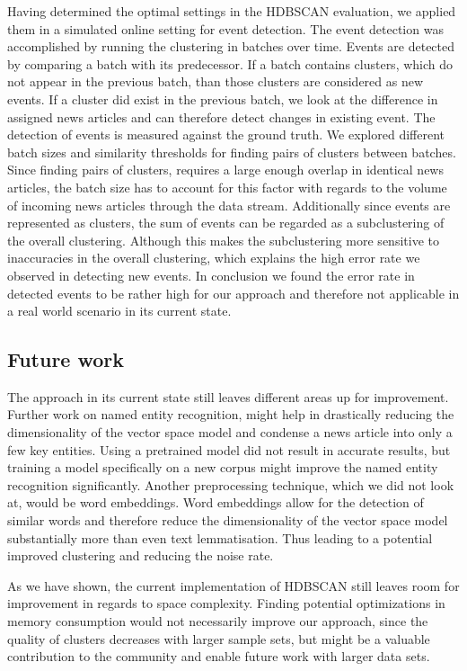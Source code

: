 Having determined the optimal settings in the HDBSCAN evaluation,
we applied them in a simulated online setting for event detection.
The event detection was accomplished by running the clustering in batches over time.
Events are detected by comparing a batch with its predecessor.
If a batch contains clusters, which do not appear in the previous batch,
than those clusters are considered as new events.
If a cluster did exist in the previous batch,
we look at the difference in assigned news articles and can therefore detect changes in existing event.
The detection of events is measured against the ground truth.
We explored different batch sizes and similarity thresholds for finding pairs of clusters between batches.
Since finding pairs of clusters, requires a large enough overlap in identical news articles,
the batch size has to account for this factor with regards to the volume of incoming news articles through the data stream.
Additionally since events are represented as clusters,
the sum of events can be regarded as a subclustering of the overall clustering.
Although this makes the subclustering more sensitive to inaccuracies in the overall clustering,
which explains the high error rate we observed in detecting new events.
In conclusion we found the error rate in detected events to be rather high for our approach
and therefore not applicable in a real world scenario in its current state.

\subsection{Future work}

The approach in its current state still leaves different areas up for improvement.
Further work on named entity recognition, might help in drastically reducing the dimensionality of the vector space model
and condense a news article into only a few key entities.
Using a pretrained model did not result in accurate results,
but training a model specifically on a new corpus might improve the named entity recognition significantly.
Another preprocessing technique, which we did not look at, would be word embeddings.
Word embeddings allow for the detection of similar words and therefore reduce the dimensionality
of the vector space model substantially more than even text lemmatisation.
Thus leading to a potential improved clustering and reducing the noise rate.

As we have shown, the current implementation of HDBSCAN still leaves room for improvement in regards to space complexity.
Finding potential optimizations in memory consumption would not necessarily improve our approach,
since the quality of clusters decreases with larger sample sets,
but might be a valuable contribution to the community and enable future work with larger data sets.

